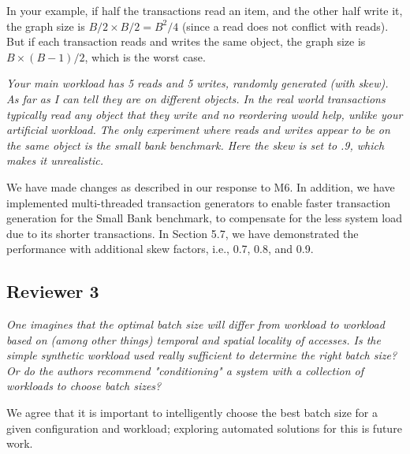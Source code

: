 \documentclass{article}
\begin{document}
In your example, if half the transactions read an item, and the other half write it, the graph size is $B/2\times B/2=B^2/4$ (since a read does not conflict with reads). But if each transaction reads and writes the same object, the graph size is $B\times (B-1)/2$, which is the worst case.


\emph{Your main workload has 5 reads and 5 writes, randomly generated (with skew). As far as I can tell they are on different objects. In the real world transactions typically read any object that they write and no reordering would help, unlike your artificial workload. The only experiment where reads and writes appear to be on the same object is the small bank benchmark. Here the skew is set to .9, which makes it unrealistic. }

We have made changes as described in our response to M6. In addition, we have implemented multi-threaded transaction generators to enable faster transaction generation for the Small Bank benchmark, to compensate for the less system load due to its shorter transactions. In Section 5.7, we have demonstrated the performance with additional skew factors, i.e., 0.7, 0.8, and 0.9.

\subsection{Reviewer 3}

\emph{One imagines that the optimal batch size will differ from workload to workload based on (among other things) temporal and spatial locality of accesses. Is the simple synthetic workload used really sufficient to determine the right batch size? Or do the authors recommend "conditioning" a system with a collection of workloads to choose batch sizes?}

We agree that it is important to intelligently choose the best batch size for a given configuration and workload; exploring automated solutions for this is future work.
\end{document}

